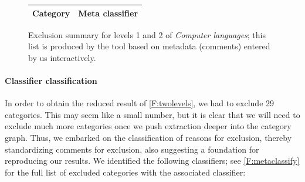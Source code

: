 
\begin{figure}[t!]
{\footnotesize

\begin{center}
\noindent
\begin{tabular}{l|l}
\textbf{Category} & \textbf{Meta classifier} \\\hline

\end{tabular}
\end{center}

\vspace{-42\in}

}
\caption{Exclusion summary for levels 1 and 2 of \emph{Computer languages}; this list is produced by the \WikiTax{} tool based on metadata (comments) entered by us interactively.}
\label{F:metaclassify}
\vspace{-42\in}
\end{figure}


\paragraph*{\textbf{Classifier classification}}

In order to obtain the reduced result of \autoref{F:twolevels}, we had to exclude 29 categories. This may seem like a small number, but it is clear that we will need to exclude much more categories once we push extraction deeper into the category graph. Thus, we embarked on the classification of reasons for exclusion, thereby standardizing comments for exclusion, also suggesting a foundation for reproducing our results. We identified the following classifiers; see \autoref{F:metaclassify} for the full list of excluded categories with the associated classifier:

\smallskip

